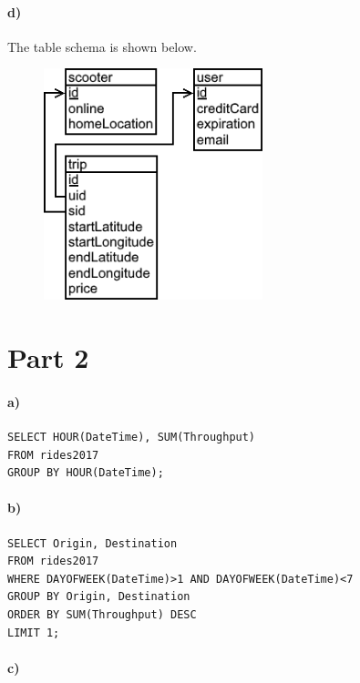 \documentclass[12pt]{article}
\begin{document}
\pagebreak

\paragraph{d)}

The table schema is shown below.
\begin{figure}[h]
    \begin{center}
        \includegraphics[width=2.5in]{problem1d.png}
    \end{center}
\end{figure}

\section*{Part 2}

\paragraph{a)}

\begin{verbatim}
SELECT HOUR(DateTime), SUM(Throughput)
FROM rides2017
GROUP BY HOUR(DateTime);
\end{verbatim}

\paragraph{b)}

\begin{verbatim}
SELECT Origin, Destination
FROM rides2017
WHERE DAYOFWEEK(DateTime)>1 AND DAYOFWEEK(DateTime)<7
GROUP BY Origin, Destination
ORDER BY SUM(Throughput) DESC
LIMIT 1;
\end{verbatim}

\filbreak

\paragraph{c)}
\end{document}
